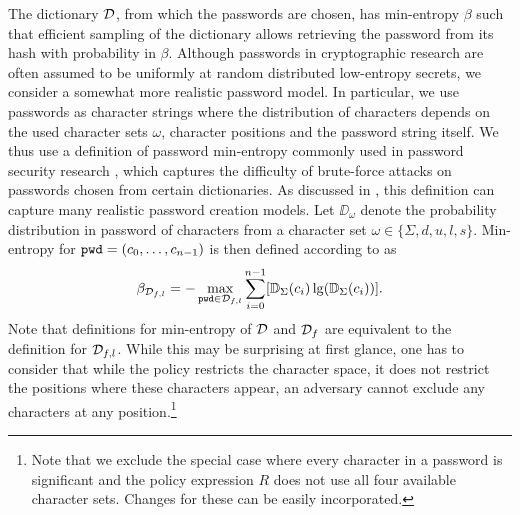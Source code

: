 The dictionary $\mathcal{D}$, from which the passwords are chosen, has min-entropy $\beta$ such that efficient sampling of the dictionary allows retrieving the password from its hash with probability in $\beta$.
Although passwords in cryptographic research are often assumed to be uniformly at random distributed low-entropy secrets, we consider a somewhat more realistic password model.
In particular, we use passwords as character strings where the distribution of characters depends on the used character sets $\omega$, character positions and the password string itself.
We thus use a definition of password min-entropy commonly used in password security research \cite{ShayKKLMBCC10,KomanduriSKMBCCE11,MazurekKVBCCKSU13}, which captures the difficulty of brute-force attacks on passwords chosen from certain dictionaries.
As discussed in \cite{ShayKKLMBCC10,KomanduriSKMBCCE11}, this definition can capture many realistic password creation models.
Let $\DD_\omega$ denote the probability distribution in password \pwd of characters from a character set $\omega\in\{\Sigma,d,u,l,s\}$.
Min-entropy for $\mathtt{pwd}=(c_0,\dots,c_{n-1})$ is then defined according to \citet{shannon48} as
\[
  \beta_{\mathcal{D}_{f,l}} = -\max_{\mathtt{pwd}\in \mathcal{D}_{f,l}} \sum_{i=0}^{n-1} [\mathbb{D}_\Sigma(c_i)\lg(\mathbb{D}_\Sigma(c_i))].
\]
Note that definitions for min-entropy of $\mathcal{D}$ and $\mathcal{D}_f$ are equivalent to the definition for $\mathcal{D}_{f,l}$.
While this may be surprising at first glance, one has to consider that while the policy restricts the character space, it does not restrict the positions where these characters appear, \ie an adversary cannot exclude any characters at any position.\footnote{Note that we exclude the special case where every character in a password is significant and the policy expression $R$ does not use all four available character sets. Changes for these can be easily incorporated.}

